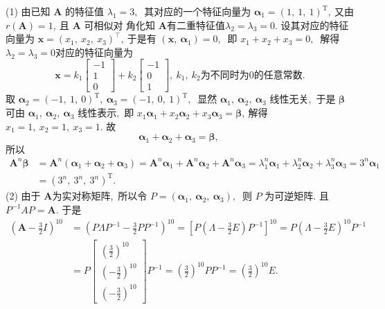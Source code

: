 	\begin{solution}
		(1) 由已知 $ \boldsymbol{A}$  的特征值 $ \lambda_{1}=3 ,\ $ 其对应的一个特征向量为 $ \boldsymbol{\alpha}_{1}=(1,\ 1,\ 1)^{\mathrm{T}} ,\  $又由 $ r(\boldsymbol{A})=1 ,\  $且 $ \boldsymbol{A} $ 可相似对 角化知  $\boldsymbol{A}  $有二重特征值$  \lambda_{2}=\lambda_{3}=0 .$ 设其对应的特征向量为  $\boldsymbol{x}=\left(x_{1},\  x_{2},\  x_{3}\right)^{\top} ,\  $于是有 $ \left(\boldsymbol{x},\  \boldsymbol{\alpha}_{1}\right)=0 ,\ $ 即 $ x_{1}+x_{2}+x_{3}=0 ,\ $ 解得  $\lambda_{2}=\lambda_{3}=0  $对应的特征向量为
		$$\boldsymbol{x}=k_{1}\left[\begin{array}{c}-1 \\ 1 \\ 0\end{array}\right]+k_{2}\left[\begin{array}{c}-1 \\ 0 \\ 1\end{array}\right],\  k_{1},\  k_{2}\text{为不同时为} 0 \text{的任意常数}.$$  
		取  $\boldsymbol{\alpha}_{2}=(-1,\ 1,\ 0)^{\mathrm{T}},\  \boldsymbol{\alpha}_{3}=(-1,\ 0,\ 1)^{\mathrm{T}} ,\ $ 显然  $\boldsymbol{\alpha}_{1},\  \boldsymbol{\alpha}_{2},\  \boldsymbol{\alpha}_{3} $ 线性无关,\ 于是 $ \boldsymbol{\beta} $ 可由  $\boldsymbol{\alpha}_{1},\  \boldsymbol{\alpha}_{2},\  \boldsymbol{\alpha}_{3}$  线性表示,\  即  $x_{1} \boldsymbol{\alpha}_{1}+x_{2} \boldsymbol{\alpha}_{2}+   x_{3} \boldsymbol{\alpha}_{3}=\boldsymbol{\beta} ,\ $解得 $ x_{1}=1,\  x_{2}=1,\  x_{3}=1 .$
		故  $$\boldsymbol{\alpha}_{1}+\boldsymbol{\alpha}_{2}+\boldsymbol{\alpha}_{3}=\boldsymbol{\beta} ,\  $$所以
		$$\begin{aligned}
			\boldsymbol{A}^{n} \boldsymbol{\beta} & =\boldsymbol{A}^{n}\left(\boldsymbol{\alpha}_{1}+\boldsymbol{\alpha}_{2}+\boldsymbol{\alpha}_{3}\right)=\boldsymbol{A}^{n} \boldsymbol{\alpha}_{1}+\boldsymbol{A}^{n} \boldsymbol{\alpha}_{2}+\boldsymbol{A}^{n} \boldsymbol{\alpha}_{3}=\lambda_{1}^{n} \boldsymbol{\alpha}_{1}+\lambda_{2}^{n} \boldsymbol{\alpha}_{2}+\lambda_{3}^{n} \boldsymbol{\alpha}_{3}=3^{n} \boldsymbol{\alpha}_{1} \\
			& =\left(3^{n},\  3^{n},\  3^{n}\right)^{\mathrm{T}} .
		\end{aligned}$$
		(2) 由于 $ \boldsymbol{A}  $为实对称矩阵,\  所以令  $P=\left(\boldsymbol{\alpha}_{1},\  \boldsymbol{\alpha}_{2},\  \boldsymbol{\alpha}_{3}\right) ,\ $ 则 $ P$  为可逆矩阵.
		且  $P^{-1} A P=\boldsymbol{A} .$ 于是
		$$\begin{aligned}
			\left(\boldsymbol{A}-\frac{3}{2} I\right)^{10} & =\left(P \Lambda P^{-1}-\frac{3}{2} P P^{-1}\right)^{10}=\left[P\left(\Lambda-\frac{3}{2} E\right) P^{-1}\right]^{10}=P\left(\Lambda-\frac{3}{2} E\right)^{10} P^{-1} \\
			& =P\left[\begin{array}{c}
				\left(\frac{3}{2}\right)^{10} \\
				\left(-\frac{3}{2}\right)^{10} \\
				\left(-\frac{3}{2}\right)^{10}
			\end{array}\right] P^{-1}=\left(\frac{3}{2}\right)^{10} P P^{-1}=\left(\frac{3}{2}\right)^{10} E .
		\end{aligned}$$
	\end{solution}

